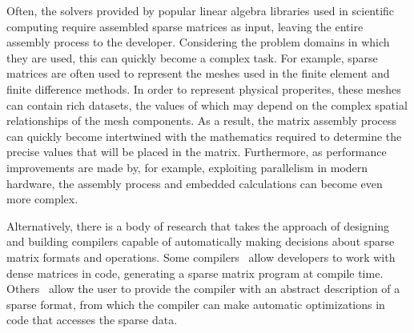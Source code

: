 Often, the solvers provided by popular linear algebra libraries used in scientific computing require assembled sparse matrices as input, leaving the entire assembly process to the developer.  Considering the problem domains in which they are used, this can quickly become a complex task.  For example, sparse matrices are often used to represent the meshes used in the finite element and finite difference methods.  In order to represent physical properites, these meshes can contain rich datasets, the values of which may depend on the complex spatial relationships of the mesh components.  As a result, the matrix assembly process can quickly become intertwined with the mathematics required to determine the precise values that will be placed in the matrix.  Furthermore, as performance improvements are made by, for example, exploiting parallelism in modern hardware, the assembly process and embedded calculations can become even more complex.



Alternatively, there is a body of research that takes the approach of designing and building compilers capable of automatically making decisions about sparse matrix formats and operations.  Some compilers~\cite{bik1995, bik1996} allow developers to work with dense matrices in code, generating a sparse matrix program at compile time.  Others~\cite{kotlyar1997} allow the user to provide the compiler with an abstract description of a sparse format, from which the compiler can make automatic optimizations in code that accesses the sparse data.

